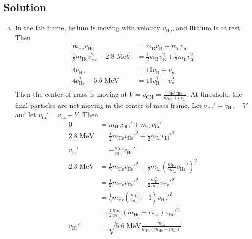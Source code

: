 \documentclass[solutions]{esg8012pset}
\begin{document}
\subsection*{Solution}
  \begin{enumerate}[a)]
    \item In the lab frame, helium is moving with velocity $v_{\text{He}}$, and lithium is at rest.  Then \begin{align*}
    m_{\text{He}}v_{\text{He}} & = m_{\text{B}}v_{\text{B}} + m_{\text{n}}v_{\text{n}} \\
    \frac{1}{2}m_{\text{He}}v_{\text{He}}^2 - 2.8\text{ MeV} & = \frac{1}{2}m_{\text{B}}v_{\text{B}}^2 + \frac{1}{2}m_{\text{n}}v_{\text{n}}^2 \\
    \\
    4v_{\text{He}} & = 10v_{\text{B}} + v_{\text{n}} \\
    4v_{\text{He}}^2 - 5.6\text{ MeV} & = 10v_{\text{B}}^2 + v_{\text{n}}^2 \\
    \end{align*}
    Then the center of mass is moving at $V = v_{\text{CM}} = \frac{v_{\text{He}} m_{\text{He}}}{m_{\text{He}} + m_{\text{Li}}}$.  At threshold, the final particles are not moving in the center of mass frame.  Let $v_{\text{He}}' = v_{\text{He}} - V$ and let $v_{\text{Li}}' = v_{\text{Li}} - V$.  Then \begin{align*}
    0 & = m_{\text{He}}v_{\text{He}}' + m_{\text{Li}}v_{\text{Li}}' \\
    2.8\text{ MeV} & = \frac{1}{2}m_{\text{He}}v_{\text{He}}'^2 + \frac{1}{2}m_{\text{Li}}v_{\text{Li}}'^2 \\
    \\
    v_{\text{Li}}' & = -\frac{m_{\text{He}}}{m_{\text{Li}}}v_{\text{He}}' \\
    2.8\text{ MeV} & = \frac{1}{2}m_{\text{He}}v_{\text{He}}'^2 + \frac{1}{2}m_{\text{Li}}\left(\frac{m_{\text{He}}}{m_{\text{Li}}}v_{\text{He}}'\right)^2 \\
      & = \frac{1}{2}m_{\text{He}}v_{\text{He}}'^2 + \frac{1}{2}\frac{m_{\text{He}}^2}{m_{\text{Li}}}v_{\text{He}}'^2 \\
      & = \frac{1}{2}m_{\text{He}}\left(\frac{m_{\text{He}}}{m_{\text{Li}}} + 1\right)v_{\text{He}}'^2 \\
      & = \frac{1}{2}\frac{m_{\text{He}}}{m_{\text{Li}}}(m_{\text{He}} + m_{\text{Li}})v_{\text{He}}'^2 \\
    v_{\text{He}}' & = \sqrt{5.6\text{ MeV}\frac{m_{\text{Li}}}{m_{\text{He}}(m_{\text{He}} + m_{\text{Li}})}} \\

\end{align*}
\end{enumerate}
\end{document}
